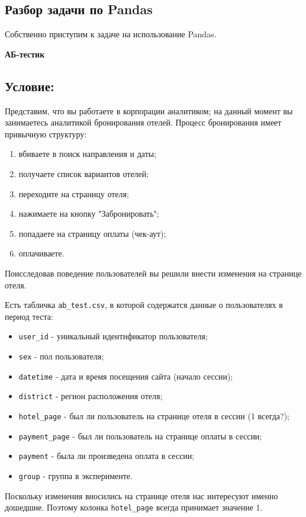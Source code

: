 \documentclass[pract]{SCWorks}
\begin{document}
\subsection{Разбор задачи по Pandas}

Собственно приступим к задаче на использование Pandas.

\textbf{АБ-тестик}

\subsection*{Условие:}
Представим, что вы работаете в корпорации аналитиком; на данный момент вы занимаетесь аналитикой бронирования отелей. 
Процесс бронирования имеет привычную структуру:
\begin{enumerate}
    \item вбиваете в поиск направления и даты;
    \item получаете список вариантов отелей;
    \item переходите на страницу отеля;
    \item нажимаете на кнопку "Забронировать";
    \item попадаете на страницу оплаты (чек-аут);
    \item оплачиваете.
\end{enumerate}
Поисследовав поведение пользователей вы решили внести изменения на странице отеля.

Есть табличка \texttt{ab\_test.csv}, в которой содержатся данные о пользователях в период теста:
\begin{itemize}
    \item \texttt{user\_id} - уникальный идентификатор пользователя;
    \item \texttt{sex} - пол пользователя;
    \item \texttt{datetime} - дата и время посещения сайта (начало сессии);
    \item \texttt{district} - регион расположения отеля;
    \item \texttt{hotel\_page} - был ли пользователь на странице отеля в сессии (1 всегда?);
    \item \texttt{payment\_page} - был ли пользователь на странице оплаты в сессии;
    \item \texttt{payment} - была ли произведена оплата в сессии;
    \item \texttt{group} - группа в эксперименте.
\end{itemize}
Поскольку изменения вносились на странице отеля нас интересуют именно дошедшие.
Поэтому колонка \texttt{hotel\_page} всегда принимает значение 1.
\end{document}
